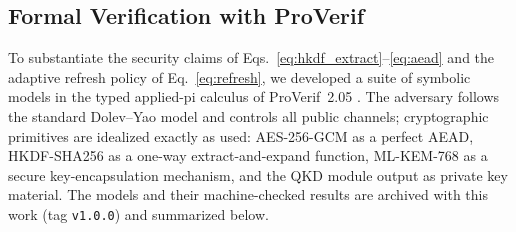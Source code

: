 \documentclass[journal]{IEEEtran}
\begin{document}
\subsection{Formal Verification with ProVerif}
\label{sec:proverif}

To substantiate the security claims of Eqs.~\eqref{eq:hkdf_extract}--\eqref{eq:aead} and
the adaptive refresh policy of Eq.~\eqref{eq:refresh}, we developed a suite of symbolic
models in the typed applied-pi calculus of ProVerif~2.05 \cite{blanchet2016proverif}. The
adversary follows the standard Dolev--Yao model and controls all public channels;
cryptographic primitives are idealized exactly as used: AES-256-GCM as a perfect AEAD,
HKDF-SHA256 as a one-way extract-and-expand function, ML-KEM-768 as a secure
key-encapsulation mechanism, and the QKD module output as private key material. The
models and their machine-checked results are archived with this work (tag
\texttt{v1.0.0}) and summarized below.
\end{document}
